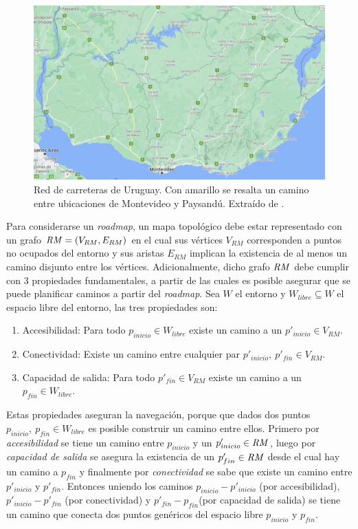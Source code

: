 \begin{figure}[H]
  \center
  \includegraphics[width=0.9\linewidth]{imagenes/uruguayvialMarcado.png}
  \caption[Red de carreteras de Uruguay.]{Red de carreteras de Uruguay. Con amarillo se resalta un camino entre ubicaciones de Montevideo y Paysandú. Extraído de \cite{googlemaps}.}\label{fig:ejemplovial}
\end{figure} 

Para considerarse un \emph{roadmap}, un mapa topológico debe estar representado
con un grafo $\mathit{RM}=(V_{RM},E_{RM})$ en el cual sus vértices $V_{RM}$
corresponden a puntos no ocupados del entorno y sus aristas $E_{RM}$
implican la existencia de al menos un camino disjunto entre los
vértices. Adicionalmente, dicho grafo $\mathit{RM}$ debe cumplir con 3
propiedades fundamentales, a partir de las cuales es posible asegurar
que se puede planificar caminos a partir del \emph{roadmap}. Sea $W$ el entorno
y $W_{libre} \subseteq W$ el espacio libre del entorno, las tres
propiedades son:

\begin{enumerate}
  \item Accesibilidad: Para todo $p_{inicio} \in W_{libre}$ existe un camino a un $p'_{inicio}\in V_{RM}$. %
  \item Conectividad: Existe un camino entre cualquier par $p'_{inicio},\ p'_{fin} \in V_{RM}$.
  \item Capacidad de salida: Para todo $p'_{fin} \in V_{RM}$ existe un camino a un $p_{fin} \in W_{libre}$.
\end{enumerate}

Estas propiedades aseguran la navegación, porque que dados dos puntos $p_{inicio},\ p_{fin}\in W_{libre}$ es posible construir un camino entre ellos. Primero por \emph{accesibilidad} se tiene un camino entre $p_{inicio}$ y un $p'_{inicio}\in \mathit{RM}$, luego por \emph{capacidad de salida} se asegura la existencia de un  $p'_{fin}\in \mathit{RM}$ desde el cual hay un camino a $p_{fin}$ y finalmente por \emph{conectividad} se sabe que existe un camino entre $p'_{inicio}$ y $p'_{fin}$. Entonces uniendo los caminos $p_{inicio} - p'_{inicio}$ (por accesibilidad), $p'_{inicio} - p'_{fin}$ (por conectividad) y $p'_{fin} - p_{fin}$(por capacidad de salida) se tiene un camino que conecta dos puntos genéricos del espacio libre $p_{inicio}$ y $p_{fin}$.

